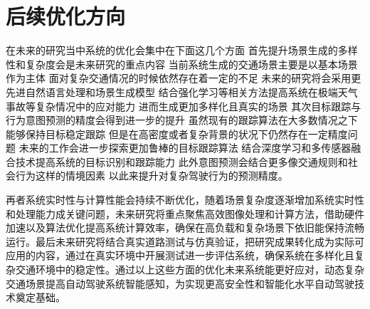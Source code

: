\section{后续优化方向}

在未来的研究当中系统的优化会集中在下面这几个方面 首先提升场景生成的多样性和复杂度会是未来研究的重点内容 当前系统生成的交通场景主要是以基本场景作为主体 面对复杂交通情况的时候依然存在着一定的不足 未来的研究将会采用更先进自然语言处理和场景生成模型 结合强化学习等相关方法提高系统在极端天气事故等复杂情况中的应对能力 进而生成更加多样化且真实的场景 其次目标跟踪与行为意图预测的精度会得到进一步的提升 虽然现有的跟踪算法在大多数情况之下能够保持目标稳定跟踪 但是在高密度或者复杂背景的状况下仍然存在一定精度问题 未来的工作会进一步探索更加鲁棒的目标跟踪算法 结合深度学习和多传感器融合技术提高系统的目标识别和跟踪能力 此外意图预测会结合更多像交通规则和社会行为这样的情境因素 以此来提升对复杂驾驶行为的预测精度。

再者系统实时性与计算性能会持续不断优化，随着场景复杂度逐渐增加系统实时性和处理能力成关键问题，未来研究将重点聚焦高效图像处理和计算方法，借助硬件加速以及算法优化提高系统计算效率，确保在高负载和复杂场景下依旧能保持流畅运行。最后未来研究将结合真实道路测试与仿真验证，把研究成果转化成为实际可应用的内容，通过在真实环境中开展测试进一步评估系统，确保系统在多样化且复杂交通环境中的稳定性。通过以上这些方面的优化未来系统能更好应对，动态复杂交通场景提高自动驾驶系统智能感知，为实现更高安全性和智能化水平自动驾驶技术奠定基础。
